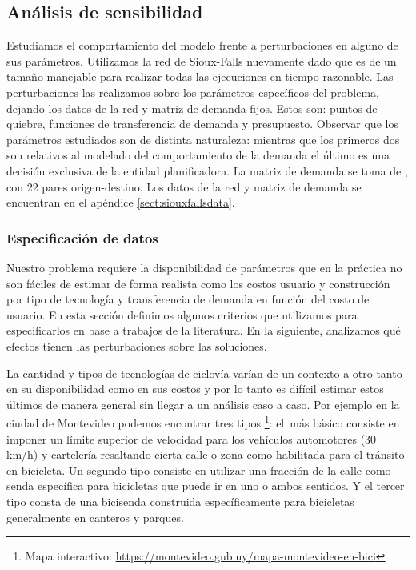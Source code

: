 \documentclass{article}
\begin{document}
  \subsection{Análisis de sensibilidad}

  Estudiamos el comportamiento del modelo frente a perturbaciones en alguno de sus parámetros. Utilizamos la red de Sioux-Falls nuevamente dado que es de un tamaño manejable para realizar todas las ejecuciones en tiempo razonable. Las perturbaciones las realizamos sobre los parámetros específicos del problema, dejando los datos de la red y matriz de demanda fijos. Estos son: puntos de quiebre, funciones de transferencia de demanda y presupuesto. Observar que los parámetros estudiados son de distinta naturaleza: mientras que los primeros dos son relativos al modelado del comportamiento de la demanda el último es una decisión exclusiva de la entidad planificadora. La matriz de demanda se toma de \cite{liu2019}, con 22 pares origen-destino. Los datos de la red y matriz de demanda se encuentran en el apéndice \ref{sect:siouxfallsdata}.

  \subsubsection{Especificación de datos}
  \label{sect:dataspecification}

  Nuestro problema requiere la disponibilidad de parámetros que en la práctica no son fáciles de estimar de forma realista como los costos usuario y construcción por tipo de tecnología y transferencia de demanda en función del costo de usuario. En esta sección definimos algunos criterios que utilizamos para especificarlos en base a trabajos de la literatura. En la siguiente, analizamos qué efectos tienen las perturbaciones sobre las soluciones.

  La cantidad y tipos de tecnologías de ciclovía varían de un contexto a otro tanto en su disponibilidad como en sus costos y por lo tanto es difícil estimar estos últimos de manera general sin llegar a un análisis caso a caso. Por ejemplo en la ciudad de Montevideo podemos encontrar tres tipos \footnote{Mapa interactivo: \url{https://montevideo.gub.uy/mapa-montevideo-en-bici}}: el más básico consiste en imponer un límite superior de velocidad para los vehículos automotores (30 km/h) y cartelería resaltando cierta calle o zona como habilitada para el tránsito en bicicleta. Un segundo tipo consiste en utilizar una fracción de la calle como senda específica para bicicletas que puede ir en uno o ambos sentidos. Y el tercer tipo consta de una bicisenda construida específicamente para bicicletas generalmente en canteros y parques.
\end{document}
